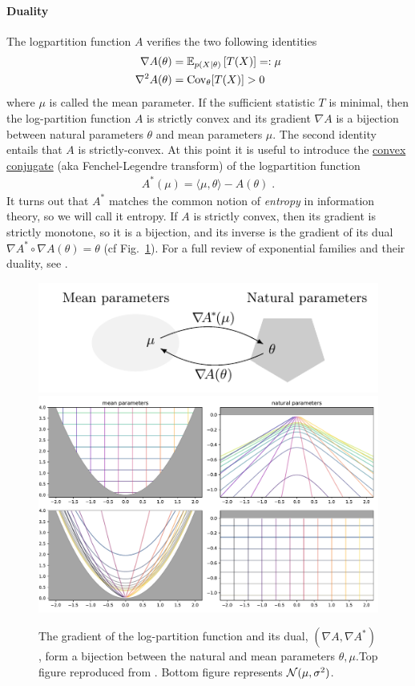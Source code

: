 \documentclass{article}
\newcommand*{\expect}[2][]{\ensuremath{\mathbb{E}_{#1} \left[ #2 \right] }} %
\newcommand{\logpart}{A}
\newcommand{\conj}{\logpart^*}
\newcommand{\natp}{\theta}
\newcommand{\meanp}{\mu}
\begin{document}
\paragraph{Duality}
The logpartition function $\logpart$ verifies the two following identities
\begin{align}
    \nabla\logpart(\natp) &=  \expect[p(X|\natp)]{T(X)} =: \meanp \\
    \nabla^2 \logpart(\natp) &= \Cov_\natp[T(X)] > 0
\end{align}
where $\meanp$ is called the mean parameter.
If the sufficient statistic $T$ is minimal, then the log-partition function $\logpart$ is strictly convex and its gradient $\nabla \logpart$ is a bijection between natural parameters $\natp$ and mean parameters $\mu$.
The second identity entails that $\logpart$ is strictly-convex. 
At this point it is useful to introduce the \href{https://en.wikipedia.org/wiki/Convex_conjugate}{convex conjugate} (aka Fenchel-Legendre transform) of the logpartition function
\begin{align}
	\conj(\mu) = \langle \mu, \natp \rangle - \logpart(\natp) \; .
\end{align}
It turns out that $\conj$ matches the common notion of \textit{entropy} in information theory, so we will call it entropy.
If $\logpart$ is strictly convex, then its gradient is strictly monotone, so it is a bijection, and its inverse is the gradient of its dual $\nabla\conj \circ \nabla\logpart(\natp) = \natp$ (cf Fig.~\ref{fig:duality}).
For a full review of exponential families and their duality, see \citet[Chapter 3]{wainwright2008graphical}.
\begin{figure}[ht]
	\centering
	\includegraphics[width= .6\textwidth]{figs/duality} \\
	\includegraphics[width=.7\textwidth]{figs/2d/mirrormap.pdf}
	\caption{The gradient of the log-partition function and its dual, $(\nabla \logpart, \nabla \conj)$, form a bijection between the natural and mean parameters $\natp, \meanp$.Top figure reproduced from \citet{kunstner2020homeomorphic}. Bottom figure represents ${\mathcal N}(\mu, \sigma^2)$.}
	\label{fig:duality}
\end{figure}
\end{document}
